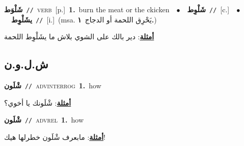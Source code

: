 \documentclass[10pt,a4paper,twoside]{article} %
\begin{document}
\begin{multicols}{2}
{\setlength\topsep{0pt}\textbf{\foreignlanguage{arabic}{شَلْوَط}}\ {\color{gray}\texttt{//}\color{black}}\ \textsc{verb}\ [p.]\ \textbf{1.}~burn the meat or the ckicken\ \ $\bullet$\ \ \setlength\topsep{0pt}\textbf{\foreignlanguage{arabic}{شَلْوِط}}\ {\color{gray}\texttt{//}\color{black}}\ [c.]\ \ $\bullet$\ \ \setlength\topsep{0pt}\textbf{\foreignlanguage{arabic}{يشَلْوِط}}\ {\color{gray}\texttt{//}\color{black}}\ [i.]\ \color{gray}(msa. \foreignlanguage{arabic}{يَحْرِق اللحمة أو الدجاج}~\foreignlanguage{arabic}{\textbf{١.}})\color{black}\  \begin{flushright}\color{gray}\foreignlanguage{arabic}{\textbf{\underline{\foreignlanguage{arabic}{أمثلة}}}: دير بالك على الشوي بلاش ما يشَلْوِط اللحمة}\end{flushright}\color{black}} \vspace{2mm}

\vspace{-3mm}
\subsection*{\color{blue}\foreignlanguage{arabic}{ش.ل.و.ن}\color{blue}{ (ntws)}} 

{\setlength\topsep{0pt}\textbf{\foreignlanguage{arabic}{شْلَون}}\ {\color{gray}\texttt{//}\color{black}}\ \textsc{adv\textunderscore interrog}\ \textbf{1.}~how\  \begin{flushright}\color{gray}\foreignlanguage{arabic}{\textbf{\underline{\foreignlanguage{arabic}{أمثلة}}}: شْلَونك يا أخوي؟}\end{flushright}\color{black}} \vspace{2mm}

{\setlength\topsep{0pt}\textbf{\foreignlanguage{arabic}{شْلَون}}\ {\color{gray}\texttt{//}\color{black}}\ \textsc{adv\textunderscore rel}\ \textbf{1.}~how\  \begin{flushright}\color{gray}\foreignlanguage{arabic}{\textbf{\underline{\foreignlanguage{arabic}{أمثلة}}}: مابعرف شْلَون خطرلها هيك!}\end{flushright}\color{black}} \vspace{2mm}


\end{multicols}
\end{document}
